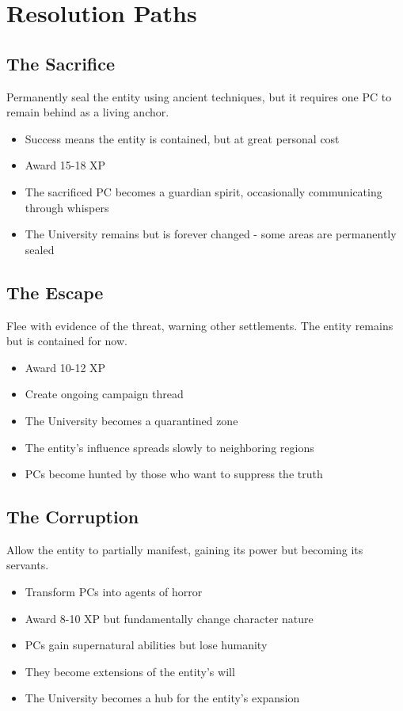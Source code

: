 \documentclass[11pt]{article}
\begin{document}
\section{Resolution Paths}

\subsection{The Sacrifice}

Permanently seal the entity using ancient techniques, but it requires one PC to remain behind as a living anchor.
\begin{itemize}
\item Success means the entity is contained, but at great personal cost
\item Award 15-18 XP
\item The sacrificed PC becomes a guardian spirit, occasionally communicating through whispers
\item The University remains but is forever changed - some areas are permanently sealed
\end{itemize}

\subsection{The Escape}

Flee with evidence of the threat, warning other settlements. The entity remains but is contained for now.
\begin{itemize}
\item Award 10-12 XP
\item Create ongoing campaign thread
\item The University becomes a quarantined zone
\item The entity's influence spreads slowly to neighboring regions
\item PCs become hunted by those who want to suppress the truth
\end{itemize}

\subsection{The Corruption}

Allow the entity to partially manifest, gaining its power but becoming its servants.
\begin{itemize}
\item Transform PCs into agents of horror
\item Award 8-10 XP but fundamentally change character nature
\item PCs gain supernatural abilities but lose humanity
\item They become extensions of the entity's will
\item The University becomes a hub for the entity's expansion
\end{itemize}
\end{document}
